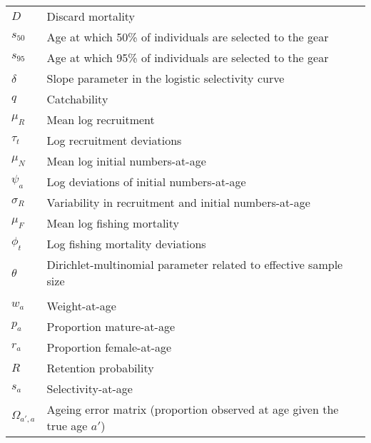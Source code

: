 \documentclass[
]{article}
\begin{document}
\begin{longtable}[t]{ll}
\hspace{1em}$D$ & Discard mortality\\
\hspace{1em}$s_{50}$ & Age at which 50\% of individuals are selected to the gear\\
\hspace{1em}$s_{95}$ & Age at which 95\% of individuals are selected to the gear\\
\hspace{1em}$\delta$ & Slope parameter in the logistic selectivity curve\\
\hspace{1em}$q$ & Catchability\\
\hspace{1em}$\mu_R$ & Mean log recruitment\\
\hspace{1em}$\tau_t$ & Log recruitment deviations\\
\hspace{1em}$\mu_N$ & Mean log initial numbers-at-age\\
\hspace{1em}$\psi_a$ & Log deviations of initial numbers-at-age\\
\hspace{1em}$\sigma_R$ & Variability in recruitment and initial numbers-at-age\\
\hspace{1em}$\mu_F$ & Mean log fishing mortality\\
\hspace{1em}$\phi_t$ & Log fishing mortality deviations\\
\hspace{1em}$\theta$ & Dirichlet-multinomial parameter related to effective sample size\\
\addlinespace[0.3em]
\multicolumn{2}{l}{\textbf{$\textit{Data and predicted variables}$}}\\
\hspace{1em}$w_a$ & Weight-at-age\\
\hspace{1em}$p_a$ & Proportion mature-at-age\\
\hspace{1em}$r_a$ & Proportion female-at-age\\
\hspace{1em}$R$ & Retention probability\\
\hspace{1em}$s_a$ & Selectivity-at-age\\
\hspace{1em}$\Omega_{a',a}$ & Ageing error matrix (proportion observed at age given the true age $a'$)\\

\end{longtable}
\end{document}
